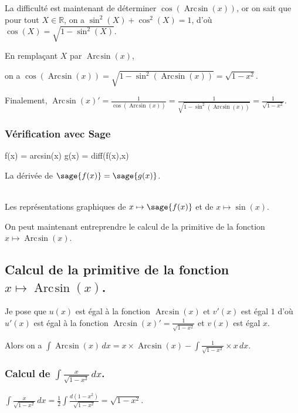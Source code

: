 \documentclass[a4paper,12pt]{report}
\def\eclaire{\mathbb}
\def\R{\ensuremath{\eclaire R}}
\renewcommand{\arcsin}{\mathop{\mathrm{Arc\mspace{2mu}sin}}}
\begin{document}
La difficulté est maintenant de déterminer $\cos(\arcsin(x))$, or on sait que pour tout $X \in \R$, on a $\sin^2(X) + \cos^2(X) = 1$, d'où $\cos(X) = \sqrt{1-\sin^2(X)}$.

En remplaçant $X$ par $\arcsin(x)$, 

on a $\cos(\arcsin(x)) = \sqrt{1-\sin^2(\arcsin(x))} = \sqrt{1- x^2}$.

Finalement, $\arcsin(x) ' = \frac{1}{\cos(\arcsin(x))}  = \frac{1}{\sqrt{1-\sin^2(\arcsin(x))}} =  \frac{1}{\sqrt{1- x^2}} $.

\subsubsection{Vérification avec Sage}

\begin{sageblock}
    f(x) = arcsin(x)
    g(x) = diff(f(x),x)
\end{sageblock}

La dérivée de $\sage{f(x)} = \sage{g(x)} $.


\begin{center}
\\
Les représentations graphiques de $x \mapsto \sage{f(x)} $ et de $x\mapsto \sin(x)$.
\end{center}


On peut maintenant entreprendre le calcul de la primitive de la  fonction  $x \mapsto \arcsin(x) $.

\subsection{Calcul de la primitive de la fonction  $x \mapsto \arcsin(x) $.}


Je pose que $u(x)$  est égal à la fonction $\arcsin(x)$ et $v'(x)$ est égal $1$  d'où $u'(x)$  est égal à la fonction $\arcsin(x) ' = \frac{1}{\sqrt{1- x^2}} $ et $v(x)$ est égal $x$.

Alors on a $\int \arcsin(x) \, dx = x \times \arcsin(x) -\int \frac{1}{\sqrt{1- x^2}} \times x \, dx $.


\subsubsection{Calcul de $\int \frac{x}{\sqrt{1- x^2}} \, dx $.}

$\int \frac{x}{\sqrt{1- x^2}} \, dx = \frac{1}{2} \int \frac{d(1-x^2)}{\sqrt{1- x^2}}= \sqrt{1- x^2} $.
\end{document}
